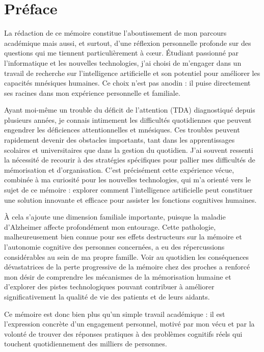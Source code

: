 \documentclass[12pt,a4paper]{report}
\begin{document}
\chapter*{Préface}

La rédaction de ce mémoire constitue l’aboutissement de mon parcours académique mais aussi, et surtout, d’une réflexion personnelle profonde sur des questions qui me tiennent particulièrement à cœur. Étudiant passionné par l'informatique et les nouvelles technologies, j’ai choisi de m’engager dans un travail de recherche sur l’intelligence artificielle et son potentiel pour améliorer les capacités mnésiques humaines. Ce choix n’est pas anodin : il puise directement ses racines dans mon expérience personnelle et familiale.

Ayant moi-même un trouble du déficit de l’attention (TDA) diagnostiqué depuis plusieurs années, je connais intimement les difficultés quotidiennes que peuvent engendrer les déficiences attentionnelles et mnésiques. Ces troubles peuvent rapidement devenir des obstacles importants, tant dans les apprentissages scolaires et universitaires que dans la gestion du quotidien. J’ai souvent ressenti la nécessité de recourir à des stratégies spécifiques pour pallier mes difficultés de mémorisation et d’organisation. C’est précisément cette expérience vécue, combinée à ma curiosité pour les nouvelles technologies, qui m’a orienté vers le sujet de ce mémoire : explorer comment l’intelligence artificielle peut constituer une solution innovante et efficace pour assister les fonctions cognitives humaines.

À cela s’ajoute une dimension familiale importante, puisque la maladie d’Alzheimer affecte profondément mon entourage. Cette pathologie, malheureusement bien connue pour ses effets destructeurs sur la mémoire et l’autonomie cognitive des personnes concernées, a eu des répercussions considérables au sein de ma propre famille. Voir au quotidien les conséquences dévastatrices de la perte progressive de la mémoire chez des proches a renforcé mon désir de comprendre les mécanismes de la mémorisation humaine et d’explorer des pistes technologiques pouvant contribuer à améliorer significativement la qualité de vie des patients et de leurs aidants.

Ce mémoire est donc bien plus qu’un simple travail académique : il est l’expression concrète d’un engagement personnel, motivé par mon vécu et par la volonté de trouver des réponses pratiques à des problèmes cognitifs réels qui touchent quotidiennement des milliers de personnes.
\end{document}
